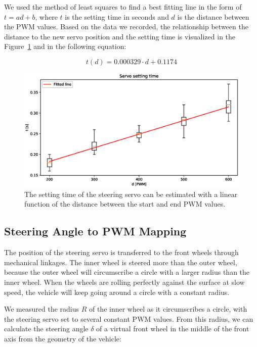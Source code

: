 We used the method of least squares to find a best fitting line in the form of $t=ad+b$, where $t$ is the setting time in seconds and $d$ is the distance between the \gls*{PWM} values. Based on the data we recorded, the relationship between the distance to the new servo position and the setting time is visualized in the Figure~\ref{fig:servo_linear_regression} and in the following equation:

\begin{equation}
\label{eq:servo_setting_time}
t(d)=0.000329\cdot d + 0.1174
\end{equation}

\begin{figure}
	\includegraphics[width=\textwidth]{../img/servo_setting_time_linreg.eps}
	\caption{The setting time of the steering servo can be estimated with a linear function of the distance between the start and end PWM values.}
	\label{fig:servo_linear_regression}
\end{figure}

\subsection{Steering Angle to PWM Mapping}

The position of the steering servo is transferred to the front wheels through mechanical linkages. The inner wheel is steered more than the outer wheel, because the outer wheel will circumscribe a circle with a larger radius than the inner wheel. When the wheels are rolling perfectly against the surface at slow speed, the vehicle will keep going around a circle with a constant radius.

We measured the radius $R$ of the inner wheel as it circumscribes a circle, with the steering servo set to several constant \gls*{PWM} values. From this radius, we can calculate the steering angle $\delta$ of a virtual front wheel in the middle of the front axis from the geometry of the vehicle:

